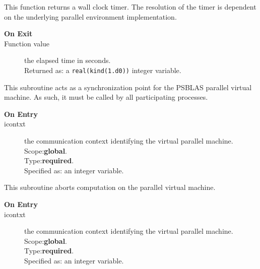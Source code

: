 

This function returns a wall clock timer. The resolution of the timer
is dependent on the underlying parallel environment implementation.
\begin{description}
\item[\bf  On Exit ]
\item[Function value] the elapsed time in seconds.\\
Returned  as: a  \verb|real(kind(1.d0))|  integer variable.
\end{description}




This subroutine acts as a synchronization point for  the  PSBLAS
parallel virtual  machine. As such, it must be called by all
participating processes. 
\begin{description}
\item[\bf  On Entry ]
\item[icontxt] the communication context identifying the virtual
  parallel machine.\\
Scope:{\bf global}.\\
Type:{\bf required}.\\
Specified as: an integer variable.
\end{description}




This subroutine aborts computation on the parallel virtual machine. 
\begin{description}
\item[\bf  On Entry ]
\item[icontxt] the communication context identifying the virtual
  parallel machine.\\
Scope:{\bf global}.\\
Type:{\bf required}.\\
Specified as: an integer variable.
\end{description}







